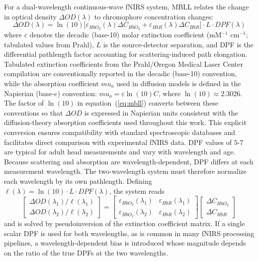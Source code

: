 \documentclass[11pt]{article}
\def\mu{mu}%
\def\mathrm#1{#1}%
\def\,{ }%
\begin{document}
For a dual-wavelength continuous-wave fNIRS system, MBLL relates the change in optical density $\Delta\mathrm{OD}(\lambda)$ to chromophore concentration changes\cite{r9,r21}:
\begin{equation}
\Delta\mathrm{OD}(\lambda) = \ln(10)\,\bigl[\varepsilon_{\mathrm{HbO_2}}(\lambda)\,\Delta C_{\mathrm{HbO_2}} + \varepsilon_{\mathrm{HbR}}(\lambda)\,\Delta C_{\mathrm{HbR}}\bigr] \cdot L \cdot \mathrm{DPF}(\lambda)
\label{eq:mbll}
\end{equation}
where $\varepsilon$ denotes the decadic (base-10) molar extinction coefficient (mM$^{-1}$\,cm$^{-1}$; tabulated values from Prahl\cite{r23}), $L$ is the source-detector separation, and DPF is the differential pathlength factor accounting for scattering-induced path elongation. Tabulated extinction coefficients from the Prahl/Oregon Medical Laser Center compilation are conventionally reported in the decadic (base-10) convention, while the absorption coefficient $\mu_a$ used in diffusion models is defined in the Napierian (base-$e$) convention: $\mu_a = \varepsilon \ln(10)\,C$, where $\ln(10) \approx 2.3026$. The factor of $\ln(10)$ in equation~(\ref{eq:mbll}) converts between these conventions so that $\Delta\mathrm{OD}$ is expressed in Napierian units consistent with the diffusion-theory absorption coefficients used throughout this work. This explicit conversion ensures compatibility with standard spectroscopic databases and facilitates direct comparison with experimental fNIRS data. DPF values of 5-7 are typical for adult head measurements and vary with wavelength and age\cite{r14,r22}. Because scattering and absorption are wavelength-dependent, DPF differs at each measurement wavelength. The two-wavelength system must therefore normalize each wavelength by its own pathlength. Defining $\ell(\lambda) = \ln(10) \cdot L \cdot \mathrm{DPF}(\lambda)$, the system reads
\begin{equation}
\begin{bmatrix} \Delta\mathrm{OD}(\lambda_1)/\ell(\lambda_1) \\ \Delta\mathrm{OD}(\lambda_2)/\ell(\lambda_2) \end{bmatrix}
= \begin{bmatrix} \varepsilon_{\mathrm{HbO_2}}(\lambda_1) & \varepsilon_{\mathrm{HbR}}(\lambda_1) \\
\varepsilon_{\mathrm{HbO_2}}(\lambda_2) & \varepsilon_{\mathrm{HbR}}(\lambda_2) \end{bmatrix}
\begin{bmatrix} \Delta C_{\mathrm{HbO_2}} \\ \Delta C_{\mathrm{HbR}} \end{bmatrix}
\label{eq:mbll_matrix}
\end{equation}
and is solved by pseudoinversion of the extinction coefficient matrix. If a single scalar DPF is used for both wavelengths, as is common in many fNIRS processing pipelines, a wavelength-dependent bias is introduced whose magnitude depends on the ratio of the true DPFs at the two wavelengths.
\end{document}

